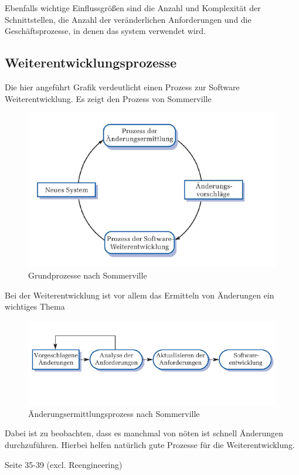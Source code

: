 Ebenfalls wichtige Einflussgrößen sind die Anzahl und Komplexität der Schnittstellen, die Anzahl der veränderlichen Anforderungen und die Geschäftsprozesse, in denen das system verwendet wird.

\subsection{Weiterentwicklungsprozesse}
Die hier angeführt Grafik verdeutlicht einen Prozess zur Software Weiterentwicklung. Es zeigt den Prozess von Sommerville 
\begin{figure}[hbtp]
\centering
\includegraphics[scale=0.5]{document/graphics/Weiterentwicklungsprozess.png} 
\caption{Grundprozesse nach Sommerville}
\end{figure}

Bei der Weiterentwicklung ist vor allem das Ermitteln von Änderungen ein wichtiges Thema 

\begin{figure}[hbtp]
\centering
\includegraphics[scale=0.5]{document/graphics/Aenderungsermittlungsprozess.png} 
\caption{Änderungsermittlungsprozess nach Sommerville}
\end{figure}

Dabei ist zu beobachten, dass es manchmal von nöten ist schnell Änderungen durchzuführen. Hierbei helfen natürlich gute Prozesse für die Weiterentwicklung.

Seite 35-39  (excl. Reengineering)